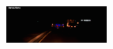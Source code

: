 \begin{multicols}{2}
\begin{figure}[H]
  \centering
  \includegraphics[width=0.3\textwidth]{text/figures/distanceCarEvent.png}
  \label{systemOverview::distanceToVehicle}
\end{figure}
\end{multicols}
